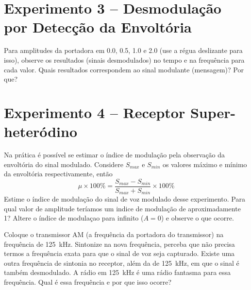 \documentclass[12pt,addpoints]{exam}
\begin{document}
\section*{Experimento 3 -- Desmodulação por Detecção da Envoltória}

\begin{questions}
    \question Para amplitudes da portadora em 0.0, 0.5, 1.0 e 2.0 (use  a régua deslizante para isso), observe os resultados (sinais desmodulados) no tempo e na frequência para cada valor. Quais resultados correspondem ao sinal modulante (mensagem)? Por que?
    \fillwithlines{0.75in}
\end{questions}

\section*{Experimento 4 -- Receptor Super-heteródino}

 \begin{questions}
    
    \question Na prática é possível se estimar o índice de modulação pela observação da envoltória do sinal modulado. Considere $S_{max}$ e $S_{min}$ os valores máximo e mínimo da envoltória respectivamente, então
    \begin{equation}
      \label{eq:mu100}
      \mu \times 100\% = \frac{S_{max} - S_{min}}{S_{max} + S_{min}}
      \times 100\%
    \end{equation}
    Estime o índice de modulação do sinal de voz modulado desse experimento. Para qual valor de amplitude teríamos um indice de modulação de aproximadamente 1? Altere o índice de modulaçao para infinito ($A = 0$) e observe o que ocorre.
    \fillwithlines{0.5in}

   \question Coloque o transmissor AM (a frequência da  portadora do transmissor) na frequência de 125~kHz. Sintonize na nova frequência, perceba que não precisa termos a frequência exata para que o sinal de voz seja capturado. Existe uma outra frequência de sintonia no receptor, além da de 125~kHz, em que o sinal é também desmodulado. A rádio em 125~kHz é uma rádio fantasma para essa frequência. Qual é essa frequência e por que isso ocorre?
   \fillwithlines{1in}

 \end{questions}
\end{document}
